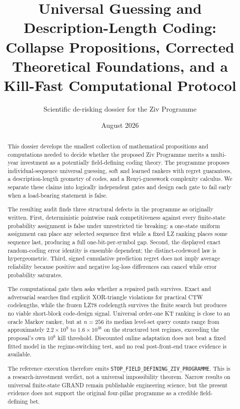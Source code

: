 \documentclass[11pt]{article}
\title{\textbf{Universal Guessing and Description-Length Coding:}\\
Collapse Propositions, Corrected Theoretical Foundations, and a Kill-Fast Computational Protocol}
\author{Scientific de-risking dossier for the Ziv Programme}
\date{August 2026}
\newcommand{\STOP}{\texttt{STOP\_FIELD\_DEFINING\_ZIV\_PROGRAMME}}
\begin{document}
\maketitle

\begin{abstract}
This dossier develops the smallest collection of mathematical propositions and computations needed to decide whether the proposed Ziv Programme merits a multi-year investment as a potentially field-defining coding theory.  The programme proposes individual-sequence universal guessing, soft and learned rankers with regret guarantees, a description-length geometry of codes, and a Renyi-guesswork complexity calculus.  We separate these claims into logically independent gates and design each gate to fail early when a load-bearing statement is false.

The resulting audit finds three structural defects in the programme as originally written.  First, deterministic pointwise rank competitiveness against every finite-state probability assignment is false under unrestricted tie breaking: a one-state uniform assignment can place any selected sequence first while a fixed LZ ranking places some sequence last, producing a full one-bit-per-symbol gap.  Second, the displayed exact random-coding error identity is ensemble dependent; the distinct-codeword law is hypergeometric.  Third, signed cumulative prediction regret does not imply average reliability because positive and negative log-loss differences can cancel while error probability saturates.

The computational gate then asks whether a repaired path survives.  Exact and adversarial searches find explicit XOR-triangle violations for practical CTW codelengths, while the frozen LZ78 codelength survives the finite search but produces no viable short-block code-design signal.  Universal order-one KT ranking is close to an oracle Markov ranker, but at $n=256$ its median level-set query counts range from approximately $2.2\times10^9$ to $1.6\times10^{38}$ on the structured test regimes, exceeding the proposal's own $10^6$ kill threshold.  Discounted online adaptation does not beat a fixed fitted model in the regime-switching test, and no real post-front-end trace evidence is available.

The reference execution therefore emits \STOP.  This is a research-investment verdict, not a universal impossibility theorem.  Narrow results on universal finite-state GRAND remain publishable engineering science, but the present evidence does not support the original four-pillar programme as a credible field-defining bet.
\end{abstract}
\end{document}
